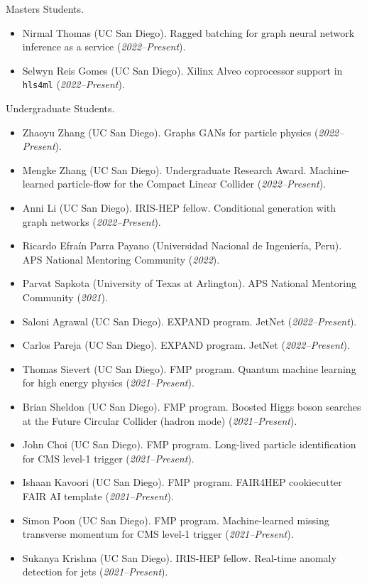 \documentclass[11pt]{res}
\begin{document}
\begin{resume}
  Masters Students.
  \begin{itemize}
    \itemsep-0.3em
    \item Nirmal Thomas (UC San Diego). Ragged batching for graph neural network inference as a service (\textit{2022--Present}).
    \item Selwyn Reis Gomes (UC San Diego). Xilinx Alveo coprocessor support in \texttt{hls4ml} (\textit{2022--Present}).
  \end{itemize}

  Undergraduate Students.
  \begin{itemize}
    \itemsep-0.3em
    \item Zhaoyu Zhang (UC San Diego). Graphs GANs for particle physics (\textit{2022--Present}).
    \item Mengke Zhang (UC San Diego). Undergraduate Research Award. Machine-learned particle-flow for the Compact Linear Collider (\textit{2022--Present}).
    \item Anni Li (UC San Diego). IRIS-HEP fellow. Conditional generation with graph networks (\textit{2022--Present}).
    \item Ricardo Efra\'{i}n Parra Payano (Universidad Nacional de Ingenier\'{i}a, Peru). APS National Mentoring Community (\textit{2022}).
    \item Parvat Sapkota (University of Texas at Arlington). APS National Mentoring Community (\textit{2021}).
    \item Saloni Agrawal (UC San Diego). EXPAND program. JetNet (\textit{2022--Present}).
    \item Carlos Pareja (UC San Diego). EXPAND program. JetNet (\textit{2022--Present}).
    \item Thomas Sievert (UC San Diego). FMP program. Quantum machine learning for high energy physics (\textit{2021--Present}).
    \item Brian Sheldon (UC San Diego). FMP program. Boosted Higgs boson searches at the Future Circular Collider (hadron mode) (\textit{2021--Present}).
    \item John Choi (UC San Diego). FMP program. Long-lived particle identification for CMS level-1 trigger (\textit{2021--Present}).
    \item Ishaan Kavoori (UC San Diego). FMP program. FAIR4HEP cookiecutter FAIR AI template (\textit{2021--Present}).
    \item Simon Poon (UC San Diego). FMP program. Machine-learned missing transverse momentum for CMS level-1 trigger (\textit{2021--Present}).
    \item Sukanya Krishna (UC San Diego). IRIS-HEP fellow. Real-time anomaly detection for jets (\textit{2021--Present}).

\end{itemize}
\end{resume}
\end{document}
